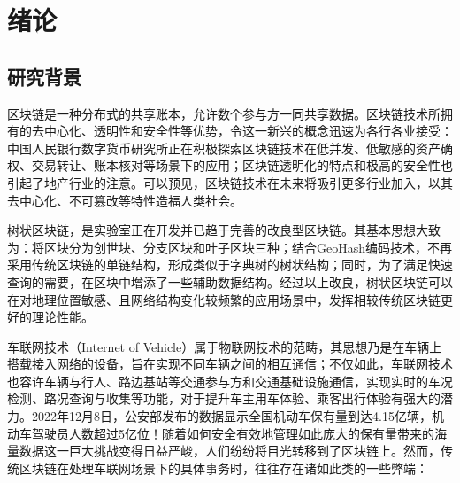 %
%
%
%
%
%

\chapter{绪论}

\section{研究背景}

区块链是一种分布式的共享账本，允许数个参与方一同共享数据。区块链技术所拥有的去中心化、透明性和安全性等优势，令这一新兴的概念迅速为各行各业接受：中国人民银行数字货币研究所正在积极探索区块链技术在低并发、低敏感的资产确权、交易转让、账本核对等场景下的应用\cite{shuYanSuo}；区块链透明化的特点和极高的安全性也引起了地产行业的注意\cite{usageOfBC}。可以预见，区块链技术在未来将吸引更多行业加入，以其去中心化、不可篡改等特性造福人类社会。

树状区块链，是实验室正在开发并已趋于完善的改良型区块链。其基本思想大致为：将区块分为创世块、分支区块和叶子区块三种；结合GeoHash编码技术，不再采用传统区块链的单链结构，形成类似于字典树的树状结构；同时，为了满足快速查询的需要，在区块中增添了一些辅助数据结构。经过以上改良，树状区块链可以在对地理位置敏感、且网络结构变化较频繁的应用场景中，发挥相较传统区块链更好的理论性能。

车联网技术（Internet of Vehicle）属于物联网技术的范畴，其思想乃是在车辆上搭载接入网络的设备，旨在实现不同车辆之间的相互通信；不仅如此，车联网技术也容许车辆与行人、路边基站等交通参与方和交通基础设施通信，实现实时的车况检测、路况查询与收集等功能，对于提升车主用车体验、乘客出行体验有强大的潜力。2022年12月8日，公安部发布的数据显示全国机动车保有量到达4.15亿辆，机动车驾驶员人数超过5亿位！随着如何安全有效地管理如此庞大的保有量带来的海量数据这一巨大挑战变得日益严峻，人们纷纷将目光转移到了区块链上\cite{bcInIoV}。然而，传统区块链在处理车联网场景下的具体事务时，往往存在诸如此类的一些弊端：

